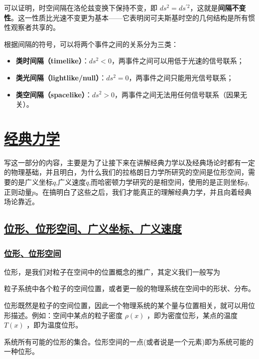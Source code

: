 可以证明，时空间隔在洛伦兹变换下保持不变，即 $ds^2 = ds^{\prime 2}$，这就是\textbf{间隔不变性}。这一性质比光速不变更为基本——它表明闵可夫斯基时空的几何结构是所有惯性观察者共享的。

根据间隔的符号，可以将两个事件之间的关系分为三类：
\begin{itemize}
    \item \textbf{类时间隔（timelike）}：$ds^2 < 0$，两事件之间可以用低于光速的信号联系；
    \item \textbf{类光间隔（lightlike/null）}：$ds^2 = 0$，两事件之间只能用光信号联系；
    \item \textbf{类空间隔（spacelike）}：$ds^2 > 0$，两事件之间无法用任何信号联系（因果无关）。
\end{itemize}



\section{\protect\hyperlink{:}{经典力学}}
写这一部分的内容，主要是为了让接下来在讲解经典力学以及经典场论时都有一定的物理基础，并且明白，为什么我们的拉格朗日力学所研究的空间是位形空间，需要的是广义坐标$q$,广义速度$\dot{q}$,而哈密顿力学研究的是相空间，使用的是正则坐标$q$,正则动量$p$。在搞明白了这些之后，我们才能真正的理解经典力学，并且向着经典场论靠近。


\subsection{\protect\hyperlink{:}{位形、位形空间、广义坐标、广义速度}}

\subsubsection{\protect\hyperlink{:}{位形、位形空间}}

位形，是我们对粒子在空间中的位置概念的推广，其定义我们一般写为
\begin{definition}[位形]
    粒子系统中各个粒子的空间位置，或者更一般的物理系统在空间中的形状、分布。
\end{definition}

位形既然是粒子的空间位置，因此一个物理系统的某个量与位置相关，就可以用位形描述。例如：空间中某点的粒子密度 $\rho(x)$ ，即为密度位形，某点的温度 $T(x)$ ，即为温度位形。

\begin{definition}[位形空间]
    系统所有可能的位形的集合。位形空间的一点(或者说是一个元素)即为系统可能的一种位形。
\end{definition}

